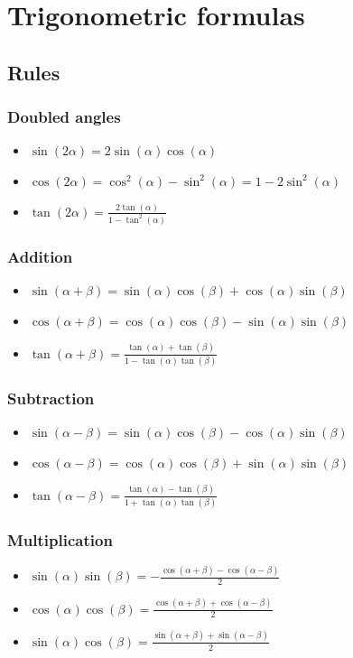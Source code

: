\documentclass[a4paper,fontsize = 8pt]{scrartcl}
\begin{document}
\section{Trigonometric formulas}

\subsection{Rules}

\subsubsection{Doubled angles}
\begin{itemize}
 \item $\sin(2\alpha) = 2 \sin(\alpha) \cos(\alpha)$
 \item $\cos(2\alpha) = \cos^2(\alpha) - \sin^2(\alpha) = 1 - 2 \sin^2(\alpha)$
 \item $\tan(2\alpha) = \frac{2\tan(\alpha)}{1 - \tan^2(\alpha)}$
\end{itemize}

\subsubsection{Addition}
\begin{itemize}
 \item $\sin(\alpha + \beta) = \sin(\alpha) \cos(\beta) + \cos(\alpha) \sin(\beta)$
 \item $\cos(\alpha + \beta) = \cos(\alpha) \cos(\beta) - \sin(\alpha) \sin(\beta)$
 \item $\tan(\alpha + \beta) = \frac{\tan(\alpha) + \tan(\beta)}{1 - \tan(\alpha) \tan(\beta)}$
\end{itemize}

\subsubsection{Subtraction}
\begin{itemize}
 \item $\sin(\alpha - \beta) = \sin(\alpha) \cos(\beta) - \cos(\alpha)\sin(\beta)$
 \item $\cos(\alpha - \beta) = \cos(\alpha) \cos(\beta) + \sin(\alpha)\sin(\beta)$
 \item $\tan(\alpha - \beta) = \frac{\tan(\alpha) - \tan(\beta)}{1+\tan(\alpha) \tan(\beta)}$
\end{itemize}

\subsubsection{Multiplication}
\begin{itemize}
 \item $\sin(\alpha) \sin(\beta) = -\frac{\cos(\alpha + \beta) - \cos(\alpha - \beta)}{2}$
 \item $\cos(\alpha) \cos(\beta) =  \frac{\cos(\alpha + \beta) + \cos(\alpha - \beta)}{2}$
 \item $\sin(\alpha) \cos(\beta) =  \frac{\sin(\alpha + \beta) + \sin(\alpha - \beta)}{2}$
\end{itemize}
\end{document}
